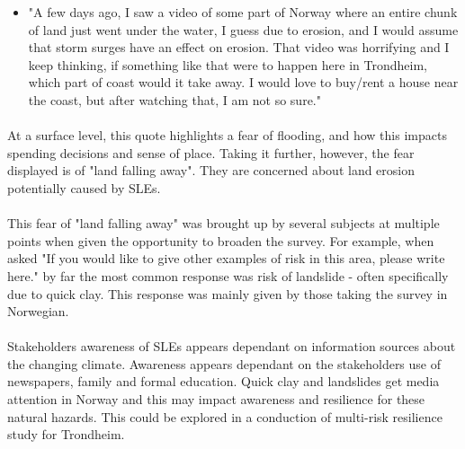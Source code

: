 \begin{itemize}
    \item "A few days ago, I saw a video of some part of Norway where an entire chunk of land just went under the water, I guess due to erosion, and I would assume that storm surges have an effect on erosion. That video was horrifying and I keep thinking, if something like that were to happen here in Trondheim, which part of coast would it take away. I would love to buy/rent a house near the coast, but after watching that, I am not so sure."
\end{itemize}
\paragraph{}

At a surface level, this quote highlights a fear of flooding, and how this impacts spending decisions and sense of place. Taking it further, however, the fear displayed is of "land falling away". They are concerned about land erosion potentially caused by SLEs.
\paragraph{}
This fear of "land falling away" was brought up by several subjects at multiple points when given the opportunity to broaden the survey. For example, when asked "If you would like to give other examples of risk in this area, please write here." by far the most common response was risk of landslide - often specifically due to quick clay. This response was mainly given by those taking the survey in Norwegian. 
\paragraph{}
Stakeholders awareness of SLEs appears dependant on information sources about the changing climate. Awareness appears dependant on the stakeholders use of newspapers, family and formal education. Quick clay and landslides get media attention in Norway and this may impact awareness and resilience for these natural hazards. This could be explored in a conduction of multi-risk resilience study for Trondheim.  
